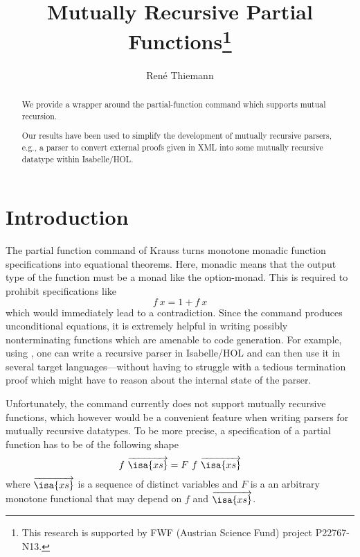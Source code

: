 \documentclass[11pt,a4paper]{article}
\newcommand\isakwd[1]{\textsf{\isa{#1}}}
\newcommand\parfun{\isakwd{partial-function}}
\newcommand\vect[1]{\overrightarrow{#1}}
\newcommand\xs{\isa{xs}}
\begin{document}
\title{Mutually Recursive Partial Functions\thanks{This research is supported by FWF (Austrian Science Fund) project P22767-N13.}}
\author{Ren\'e Thiemann}
\maketitle

\begin{abstract}
  We provide a wrapper around the partial-function command which supports
  mutual recursion. 
  
  Our results have been used to simplify the development of mutually
  recursive parsers, e.g., a parser to convert external proofs given in XML 
  into some mutually recursive datatype within Isabelle/HOL.
\end{abstract}



\tableofcontents

\section{Introduction}

The partial function command of Krauss \cite{partial_function} turns monotone monadic function specifications
into equational theorems. Here, monadic means that the output type of the function must be a monad
like the option-monad. This is required to prohibit specifications like
\[
f\ x = 1 + f\ x
\]
which would immediately lead to a contradiction. Since the command produces unconditional 
equations, it is extremely helpful in writing possibly nonterminating functions which 
are amenable to code generation. For example, using \parfun, one can  write a 
recursive parser in Isabelle/HOL and can then use it in several target languages---without having to struggle
with a tedious termination proof which might have to reason about the internal 
state of the parser.

Unfortunately, the command currently does not support mutually recursive functions, which however
would be a convenient feature when writing parsers for mutually recursive datatypes.
To be more precise, a specification of a partial function has to be of the following shape
\begin{equation}
\label{nmr}
f\ \vect{\xs} = F\ f\ \vect{\xs}
\end{equation}
where $\vect{\xs}$ is a sequence of distinct variables and $F$ is a an 
arbitrary monotone functional that may depend on $f$ and $\vect{\xs}$.
\end{document}
